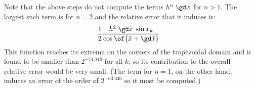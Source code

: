 \documentclass[10pt, a4paper, twoside]{basestyle}
\newcommand{\red}[1]{\tilde{#1}}
\begin{document}
Note that the above steps do not compute the terms $h^n \; \gd \red x$ for $n > 1$.  The largest such term is for $n = 2$ and the relative error that it induces is:
\[
\frac{1}{2}\frac{h^2 \; \gd \red x \; \sin x_k}{\cos\of{\red x + \gd \red x}}
\]
This function reaches its extrema on the corners of the trapezoidal domain and is found to be smaller than $2^{-74.348}$ for all $k$, so its contribution to the overall relative error would be very small.  (The term for $n = 1$, on the other hand, induces an error of the order of $2^{-63.346}$ so it must be computed.)
\end{document}
